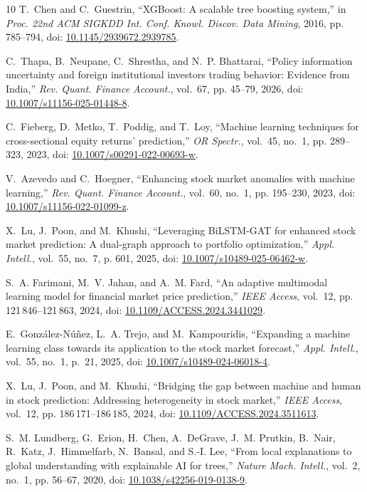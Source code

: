 \documentclass[conference]{IEEEtran}
\begin{document}
\begin{thebibliography}{10}
T.~Chen and C.~Guestrin, ``{XGBoost}: A scalable tree boosting system,'' in
  \emph{Proc. 22nd ACM SIGKDD Int. Conf. Knowl. Discov. Data Mining}, 2016, pp.
  785--794, doi: \url{10.1145/2939672.2939785}.

C.~Thapa, B.~Neupane, C.~Shrestha, and N.~P. Bhattarai, ``Policy information
  uncertainty and foreign institutional investors trading behavior: Evidence
  from {India},'' \emph{Rev. Quant. Finance Account.}, vol.~67, pp. 45--79,
  2026, doi: \url{10.1007/s11156-025-01448-8}.

C.~Fieberg, D.~Metko, T.~Poddig, and T.~Loy, ``Machine learning techniques for
  cross-sectional equity returns' prediction,'' \emph{OR Spectr.}, vol.~45,
  no.~1, pp. 289--323, 2023, doi: \url{10.1007/s00291-022-00693-w}.

V.~Azevedo and C.~Hoegner, ``Enhancing stock market anomalies with machine
  learning,'' \emph{Rev. Quant. Finance Account.}, vol.~60, no.~1, pp.
  195--230, 2023, doi: \url{10.1007/s11156-022-01099-z}.

X.~Lu, J.~Poon, and M.~Khushi, ``Leveraging {BiLSTM-GAT} for enhanced stock
  market prediction: A dual-graph approach to portfolio optimization,''
  \emph{Appl. Intell.}, vol.~55, no.~7, p. 601, 2025, doi:
  \url{10.1007/s10489-025-06462-w}.

S.~A. Farimani, M.~V. Jahan, and A.~M. Fard, ``An adaptive multimodal learning
  model for financial market price prediction,'' \emph{IEEE Access}, vol.~12,
  pp. 121\,846--121\,863, 2024, doi: \url{10.1109/ACCESS.2024.3441029}.

E.~Gonz{\'a}lez-N{\'u}{\~n}ez, L.~A. Trejo, and M.~Kampouridis, ``Expanding a
  machine learning class towards its application to the stock market
  forecast,'' \emph{Appl. Intell.}, vol.~55, no.~1, p.~21, 2025, doi:
  \url{10.1007/s10489-024-06018-4}.

X.~Lu, J.~Poon, and M.~Khushi, ``Bridging the gap between machine and human in
  stock prediction: Addressing heterogeneity in stock market,'' \emph{IEEE
  Access}, vol.~12, pp. 186\,171--186\,185, 2024, doi:
  \url{10.1109/ACCESS.2024.3511613}.

S.~M. Lundberg, G.~Erion, H.~Chen, A.~DeGrave, J.~M. Prutkin, B.~Nair, R.~Katz,
  J.~Himmelfarb, N.~Bansal, and S.-I. Lee, ``From local explanations to global
  understanding with explainable {AI} for trees,'' \emph{Nature Mach. Intell.},
  vol.~2, no.~1, pp. 56--67, 2020, doi: \url{10.1038/s42256-019-0138-9}.


\end{thebibliography}
\end{document}
